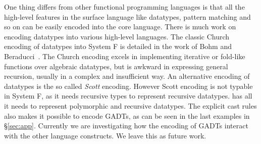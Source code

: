 One thing \name differs from other functional programming languages is that all the high-level features in the surface language like datatypes, pattern matching and so on can be easily encoded into the core language. There is much work on encoding datatypes into various high-level languages. The classic Church encoding of datatypes into System F is detailed in the work of Bohm and Beraducci~\cite{Bohm1985}. The Church encoding excels in implementing iterative or fold-like functions over algebraic datatypes, but is awkward in expressing general recursion, usually in a complex and insufficient way. An alternative encoding of datatypes is the so called \emph{Scott} encoding. However Scott encoding is not typable in System F, as it needs recursive types to represent recursive datatypes. \name has all it needs to represent polymorphic and recursive datatypes. The explicit cast rules also makes it possible to encode GADTs, as can be seen in the last examples in \S\ref{sec:app}. Currently we are investigating how the encoding of GADTs interact with the other language constructs. We leave this as future work.





